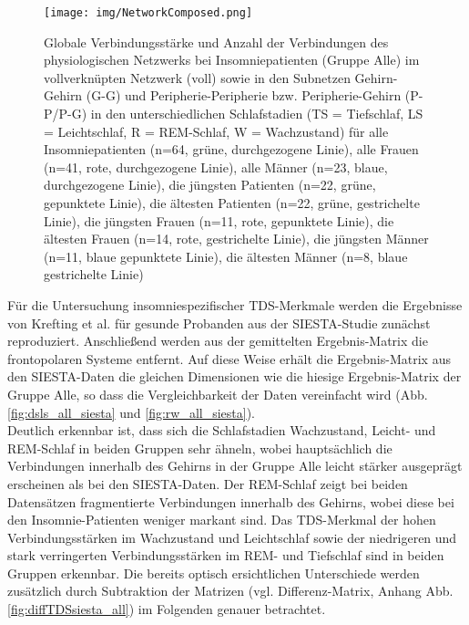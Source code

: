 \begin{figure}[H]
	\centering
	\texttt{[image: img/NetworkComposed.png]}
	\caption[Globale Verbindungsstärke und Anzahl der Verbindungen des physiologischen Netzwerks bei Insomniepatienten]{Globale Verbindungsstärke und Anzahl der Verbindungen des physiologischen Netzwerks bei Insomniepatienten (Gruppe Alle) im vollverknüpten Netzwerk (voll) sowie in den Subnetzen Gehirn-Gehirn (G-G) und Peripherie-Peripherie bzw. Peripherie-Gehirn (P-P/P-G) in den unterschiedlichen Schlafstadien (TS = Tiefschlaf, LS = Leichtschlaf, R = \acs{REM}-Schlaf, W = Wachzustand) für
alle Insomniepatienten (n=64, grüne, durchgezogene Linie), alle Frauen (n=41, rote, durchgezogene Linie), alle Männer (n=23, blaue, durchgezogene Linie), die jüngsten Patienten (n=22, grüne, gepunktete Linie), die ältesten Patienten (n=22, grüne, gestrichelte Linie), die jüngsten Frauen (n=11, rote, gepunktete Linie), die ältesten Frauen (n=14, rote, gestrichelte Linie), die jüngsten Männer (n=11, blaue gepunktete Linie), die ältesten Männer (n=8, blaue gestrichelte Linie)}
	\label{fig:NetworkComposed}
\end{figure}







\newpage
Für die Untersuchung insomniespezifischer \acs{TDS}-Merkmale werden die Ergebnisse von Krefting et al. \parencite{krefting_age_2017} für gesunde Probanden aus der SIESTA-Studie \parencite{klosch_siesta_2001} zunächst reproduziert. Anschließend werden aus der gemittelten Ergebnis-Matrix die frontopolaren Systeme entfernt. Auf diese Weise erhält die Ergebnis-Matrix aus den SIESTA-Daten die gleichen Dimensionen wie die hiesige Ergebnis-Matrix der Gruppe Alle, so dass die Vergleichbarkeit der Daten vereinfacht wird (Abb. \ref{fig:dsls_all_siesta} und \ref{fig:rw_all_siesta}).\\

Deutlich erkennbar ist, dass sich die Schlafstadien Wachzustand, Leicht- und \acs{REM}-Schlaf in beiden Gruppen sehr ähneln, wobei hauptsächlich die Verbindungen innerhalb des Gehirns in der Gruppe Alle leicht stärker ausgeprägt erscheinen als bei den SIESTA-Daten. Der \acs{REM}-Schlaf zeigt bei beiden Datensätzen fragmentierte Verbindungen innerhalb des Gehirns, wobei diese bei den Insomnie-Patienten weniger markant sind. Das \acs{TDS}-Merkmal der hohen Verbindungsstärken im Wachzustand und Leichtschlaf sowie der niedrigeren und stark verringerten Verbindungsstärken im \acs{REM}- und Tiefschlaf sind in beiden Gruppen erkennbar. Die bereits optisch ersichtlichen Unterschiede werden zusätzlich durch Subtraktion der Matrizen (vgl. Differenz-Matrix, Anhang Abb. \ref{fig:diffTDSsiesta_all}) im Folgenden genauer betrachtet.


